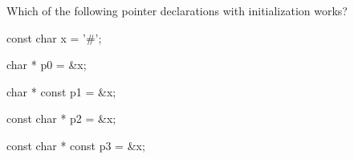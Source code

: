 Which of the following pointer declarations with initialization works?



\begin{consolethree}[escapeinside=||]

const char x = '#';

      char * p0 = &x;

      char * const p1 = &x;

const char * p2 = &x;

const char * const p3 = &x;

\end{consolethree}

